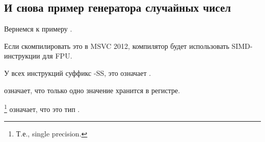 \subsection{И снова пример генератора случайных чисел}
\label{FPU_PRNG_SIMD}

Вернемся к примеру  .

Если скомпилировать это в MSVC 2012, компилятор будет использовать SIMD-инструкции для FPU.



У всех инструкций суффикс -SS, это означает .

 означает, что только одно значение хранится в регистре.

\footnote{Т.е., single precision.} означает, что это тип \Tfloat.

